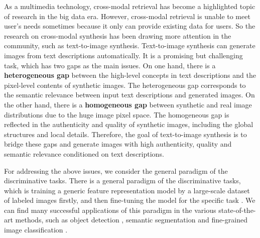 \documentclass[sigconf]{acmart}
\begin{document}
As a multimedia technology, cross-modal retrieval \cite{LiMM03CFA, RasiwasiaMM10SemanticCCA, zhang2014start, feng12014cross, wang2017adversarial} has become a highlighted topic of research in the big data era. However, cross-modal retrieval is unable to meet user's needs sometimes because it only can provide existing data for users. So the research on cross-modal synthesis has been drawing more attention in the community, such as text-to-image synthesis. Text-to-image synthesis can generate images from text descriptions automatically. It is a promising but challenging task, which has two gaps as the main issues. On one hand, there is a \textbf{heterogeneous gap} between the high-level concepts in text descriptions and the pixel-level contents of synthetic images. The heterogeneous gap corresponds to the semantic relevance between input text descriptions and generated images. On the other hand, there is a \textbf{homogeneous gap} between synthetic and real image distributions due to the huge image pixel space. The homogeneous gap is reflected in the authenticity and quality of synthetic images, including the global structures and local details. Therefore, the goal of text-to-image synthesis is to bridge these gaps and generate images with high authenticity, quality and semantic relevance conditioned on text descriptions.


For addressing the above issues, we consider the general paradigm of the discriminative tasks. There is a general paradigm of the discriminative tasks, which is training a generic feature representation model by a large-scale dataset of labeled images firstly, and then fine-tuning the model for the specific task \cite{yosinski2014transferable}. We can find many successful applications of this paradigm in the various state-of-the-art methods, such as object detection \cite{girshick2016region}, semantic segmentation \cite{long2015fully} and fine-grained image classification \cite{he2017fine}.
\end{document}
